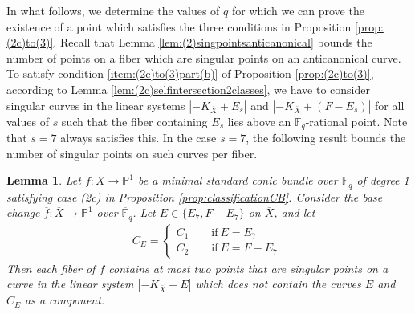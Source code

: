 \documentclass[a4paper, 11pt, reqno]{amsart}
\numberwithin{equation}{section} \numberwithin{figure}{section}
\def \F {{\mathbb F}}
\def \P {{\mathbb P}}
\def \Z {{\mathbb Z}}
\newcommand{\ra}{\rightarrow}
\newtheorem{lemma}{Lemma}
\theoremstyle{definition}
\numberwithin{lemma}{section}
\begin{document}

In what follows, we determine the values of $q$ for which we can prove the existence of a point which satisfies the three conditions in Proposition \ref{prop:(2c)to(3)}. Recall that Lemma \ref{lem:(2)singpointsanticanonical} bounds the number of points on a fiber which are singular points on an anticanonical curve. To satisfy condition \ref{item:(2c)to(3)part(b)} of Proposition \ref{prop:(2c)to(3)}, according to Lemma \ref{lem:(2c)selfintersection2classes}, we have to consider singular curves in the linear systems $|-K_{\overline{X}} + E_s|$ and $|-K_{\overline{X}} + (F- E_s)|$ for all values of $s$ such that the fiber containing $E_s$ lies above an $\F_q$-rational point. Note that $s = 7$ always satisfies this. In the case $s = 7$, the following result bounds the number of singular points on such curves per fiber. 

\begin{lemma}\label{lem:(2c)singpoints-KX+E7}
    Let $f \colon X \ra \P^1$ be a minimal standard conic bundle over $\F_q$ of degree 1 satisfying case (2c) in Proposition \ref{prop:classificationCB}. Consider the base change $\overline{f} \colon \overline{X} \ra \P^1$ over $\overline{\F}_q$. Let $E \in \{E_7, F - E_7\}$ on $\overline{X}$, and let
    \begin{align*}
        C_E = \begin{cases}
            C_1 \qquad \text{if} \ E = E_7\\
            C_2 \qquad \text{if} \ E = F - E_7.
        \end{cases} 
    \end{align*}
    Then each fiber of $\overline{f}$ contains at most two points that are singular points on a curve in the linear system $|-K_{\overline{X}} + E|$ which does not contain the curves $E$ and $C_E$ as a component.
\end{lemma}
\end{document}
